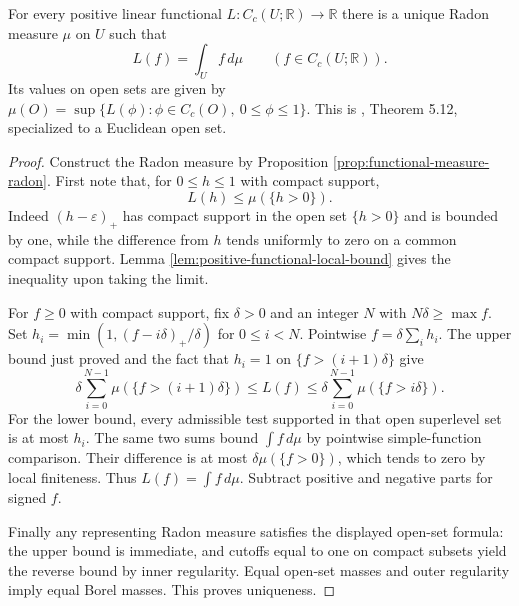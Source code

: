\begin{theorem}\label{thm:positive-riesz-representation}
For every positive linear functional $L:C_c(U;\mathbb R)\to\mathbb R$ there is a unique Radon measure $\mu$ on $U$ such that
\[
 L(f)=\int_U f\,d\mu\qquad(f\in C_c(U;\mathbb R)).
\]
Its values on open sets are given by $\mu(O)=\sup\{L(\phi):\phi\in C_c(O),\ 0\leq\phi\leq1\}$. This is \cite{Sim18}, Theorem 5.12, specialized to a Euclidean open set.
\end{theorem}
\begin{proof}
Construct the Radon measure by Proposition \ref{prop:functional-measure-radon}. First note that, for $0\leq h\leq1$ with compact support,
\[
 L(h)\leq\mu(\{h>0\}).
\]
Indeed $(h-\varepsilon)_+$ has compact support in the open set $\{h>0\}$ and is bounded by one, while the difference from $h$ tends uniformly to zero on a common compact support. Lemma \ref{lem:positive-functional-local-bound} gives the inequality upon taking the limit.

For $f\geq0$ with compact support, fix $\delta>0$ and an integer $N$ with $N\delta\geq\max f$. Set $h_i=\min(1,(f-i\delta)_+/\delta)$ for $0\leq i<N$. Pointwise $f=\delta\sum_i h_i$. The upper bound just proved and the fact that $h_i=1$ on $\{f>(i+1)\delta\}$ give
\[
 \delta\sum_{i=0}^{N-1}\mu(\{f>(i+1)\delta\})
 \leq L(f)\leq
 \delta\sum_{i=0}^{N-1}\mu(\{f>i\delta\}).
\]
For the lower bound, every admissible test supported in that open superlevel set is at most $h_i$. The same two sums bound $\int f\,d\mu$ by pointwise simple-function comparison. Their difference is at most $\delta\mu(\{f>0\})$, which tends to zero by local finiteness. Thus $L(f)=\int f\,d\mu$. Subtract positive and negative parts for signed $f$.

Finally any representing Radon measure satisfies the displayed open-set formula: the upper bound is immediate, and cutoffs equal to one on compact subsets yield the reverse bound by inner regularity. Equal open-set masses and outer regularity imply equal Borel masses. This proves uniqueness.
\end{proof}

